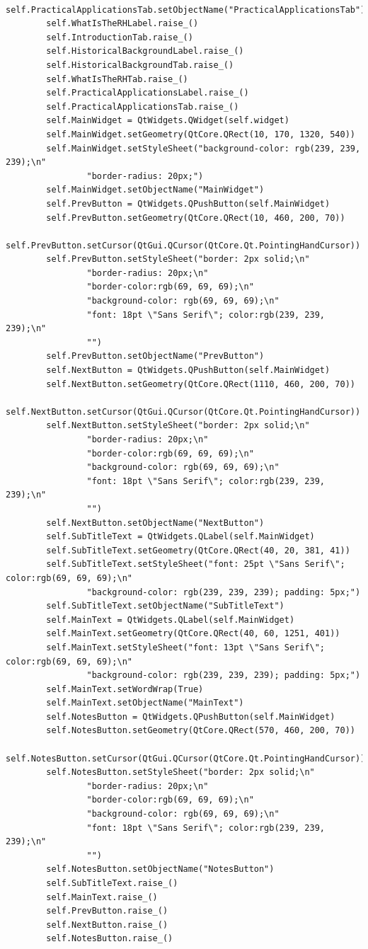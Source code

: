 \documentclass[12pt]{article}
\begin{document}
\begin{lstlisting}
        self.PracticalApplicationsTab.setObjectName("PracticalApplicationsTab")
        self.WhatIsTheRHLabel.raise_()
        self.IntroductionTab.raise_()
        self.HistoricalBackgroundLabel.raise_()
        self.HistoricalBackgroundTab.raise_()
        self.WhatIsTheRHTab.raise_()
        self.PracticalApplicationsLabel.raise_()
        self.PracticalApplicationsTab.raise_()
        self.MainWidget = QtWidgets.QWidget(self.widget)
        self.MainWidget.setGeometry(QtCore.QRect(10, 170, 1320, 540))
        self.MainWidget.setStyleSheet("background-color: rgb(239, 239, 239);\n"
                "border-radius: 20px;")
        self.MainWidget.setObjectName("MainWidget")
        self.PrevButton = QtWidgets.QPushButton(self.MainWidget)
        self.PrevButton.setGeometry(QtCore.QRect(10, 460, 200, 70))
        self.PrevButton.setCursor(QtGui.QCursor(QtCore.Qt.PointingHandCursor))
        self.PrevButton.setStyleSheet("border: 2px solid;\n"
                "border-radius: 20px;\n"
                "border-color:rgb(69, 69, 69);\n"
                "background-color: rgb(69, 69, 69);\n"
                "font: 18pt \"Sans Serif\"; color:rgb(239, 239, 239);\n"
                "")
        self.PrevButton.setObjectName("PrevButton")
        self.NextButton = QtWidgets.QPushButton(self.MainWidget)
        self.NextButton.setGeometry(QtCore.QRect(1110, 460, 200, 70))
        self.NextButton.setCursor(QtGui.QCursor(QtCore.Qt.PointingHandCursor))
        self.NextButton.setStyleSheet("border: 2px solid;\n"
                "border-radius: 20px;\n"
                "border-color:rgb(69, 69, 69);\n"
                "background-color: rgb(69, 69, 69);\n"
                "font: 18pt \"Sans Serif\"; color:rgb(239, 239, 239);\n"
                "")
        self.NextButton.setObjectName("NextButton")
        self.SubTitleText = QtWidgets.QLabel(self.MainWidget)
        self.SubTitleText.setGeometry(QtCore.QRect(40, 20, 381, 41))
        self.SubTitleText.setStyleSheet("font: 25pt \"Sans Serif\"; color:rgb(69, 69, 69);\n"
                "background-color: rgb(239, 239, 239); padding: 5px;")
        self.SubTitleText.setObjectName("SubTitleText")
        self.MainText = QtWidgets.QLabel(self.MainWidget)
        self.MainText.setGeometry(QtCore.QRect(40, 60, 1251, 401))
        self.MainText.setStyleSheet("font: 13pt \"Sans Serif\"; color:rgb(69, 69, 69);\n"
                "background-color: rgb(239, 239, 239); padding: 5px;")
        self.MainText.setWordWrap(True)
        self.MainText.setObjectName("MainText")
        self.NotesButton = QtWidgets.QPushButton(self.MainWidget)
        self.NotesButton.setGeometry(QtCore.QRect(570, 460, 200, 70))
        self.NotesButton.setCursor(QtGui.QCursor(QtCore.Qt.PointingHandCursor))
        self.NotesButton.setStyleSheet("border: 2px solid;\n"
                "border-radius: 20px;\n"
                "border-color:rgb(69, 69, 69);\n"
                "background-color: rgb(69, 69, 69);\n"
                "font: 18pt \"Sans Serif\"; color:rgb(239, 239, 239);\n"
                "")
        self.NotesButton.setObjectName("NotesButton")
        self.SubTitleText.raise_()
        self.MainText.raise_()
        self.PrevButton.raise_()
        self.NextButton.raise_()
        self.NotesButton.raise_()


\end{lstlisting}
\end{document}
